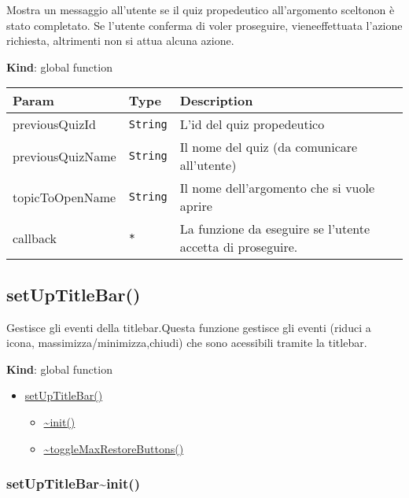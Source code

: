 Mostra un messaggio all'utente se il quiz propedeutico all'argomento
sceltonon è stato completato. Se l'utente conferma di voler proseguire,
vieneeffettuata l'azione richiesta, altrimenti non si attua alcuna
azione.

\textbf{Kind}: global function

\begin{tabularx}{\textwidth}{XXX}
\toprule
Param & Type & Description\tabularnewline
\midrule
\endhead
previousQuizId & \texttt{String} & L'id del quiz
propedeutico\tabularnewline
previousQuizName & \texttt{String} & Il nome del quiz (da comunicare
all'utente)\tabularnewline
topicToOpenName & \texttt{String} & Il nome dell'argomento che si vuole
aprire\tabularnewline
callback & \texttt{*} & La funzione da eseguire se l'utente accetta di
proseguire.\tabularnewline
\bottomrule
\end{tabularx}

\protect\hypertarget{setUpTitleBar}{}{}

\hypertarget{setuptitlebar}{%
\subsection{setUpTitleBar()}\label{setuptitlebar}}

Gestisce gli eventi della titlebar.Questa funzione gestisce gli eventi
(riduci a icona, massimizza/minimizza,chiudi) che sono acessibili
tramite la titlebar.

\textbf{Kind}: global function

\begin{itemize}
\tightlist
\item
  \protect\hyperlink{setUpTitleBar}{setUpTitleBar()}

  \begin{itemize}
  \tightlist
  \item
    \protect\hyperlink{setUpTitleBar..init}{\textasciitilde{}init()}
  \item
    \protect\hyperlink{setUpTitleBar..toggleMaxRestoreButtons}{\textasciitilde{}toggleMaxRestoreButtons()}
  \end{itemize}
\end{itemize}

\protect\hypertarget{setUpTitleBar..init}{}{}

\hypertarget{setuptitlebarinit}{%
\subsubsection{setUpTitleBar\textasciitilde{}init()}\label{setuptitlebarinit}}

